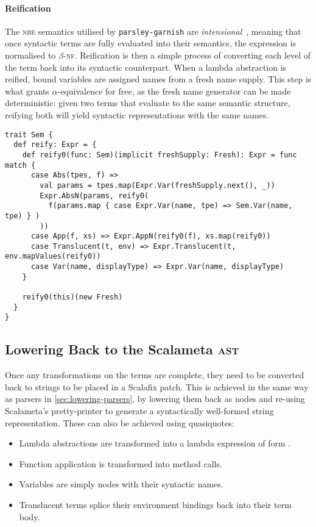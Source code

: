 \documentclass[../../../main.tex]{subfiles}
\begin{document}
\paragraph{Reification}
The \textsc{nbe} semantics utilised by \texttt{parsley-garnish} are \emph{intensional}~\cite{lindley_normalisation_2005}, meaning that once syntactic terms are fully evaluated into their semantics, the expression is normalised to $\beta$-\textsc{nf}.
Reification is then a simple process of converting each level of the term back into its syntactic counterpart.
When a lambda abstraction is reified, bound variables are assigned names from a fresh name supply.
This step is what grants $\alpha$-equivalence for free, as the fresh name generator can be made deterministic: given two terms that evaluate to the same semantic structure, reifying both will yield syntactic representations with the same names.
%
\begin{verbatim}
trait Sem {
  def reify: Expr = {
    def reify0(func: Sem)(implicit freshSupply: Fresh): Expr = func match {
      case Abs(tpes, f) =>
        val params = tpes.map(Expr.Var(freshSupply.next(), _))
        Expr.AbsN(params, reify0(
          f(params.map { case Expr.Var(name, tpe) => Sem.Var(name, tpe) } )
        ))
      case App(f, xs) => Expr.AppN(reify0(f), xs.map(reify0))
      case Translucent(t, env) => Expr.Translucent(t, env.mapValues(reify0))
      case Var(name, displayType) => Expr.Var(name, displayType)
    }

    reify0(this)(new Fresh)
  }
}
\end{verbatim}

\subsection{Lowering Back to the Scalameta \textsc{ast}}
Once any transformations on the  terms are complete, they need to be converted back to strings to be placed in a Scalafix patch.
This is achieved in the same way as parsers in \cref{sec:lowering-parsers}, by lowering them back as   nodes and re-using Scalameta's pretty-printer to generate a syntactically well-formed string representation.
These can also be achieved using quasiquotes:
\begin{itemize}
  \item Lambda abstractions are transformed into a lambda expression of form .
  \item Function application is transformed into method calls.
  \item Variables are simply  nodes with their syntactic names.
  \item Translucent terms splice their environment bindings back into their term body.
\end{itemize}
\end{document}

